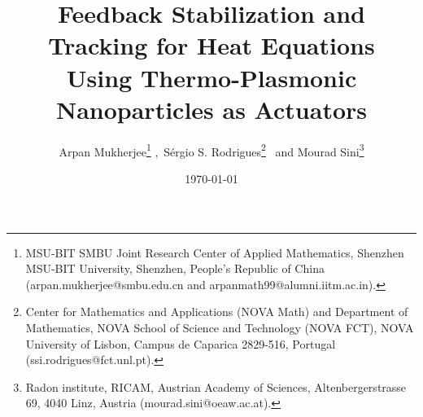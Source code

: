 \documentclass[11pt,a4paper]{article}
\numberwithin{equation}{section}
\theoremstyle{definition}
\newcommand{\1}{\mathbbm{1}}
\begin{document}
\title{%
\Large \textbf{Feedback Stabilization and Tracking for Heat Equations}\\ \textbf{Using Thermo-Plasmonic Nanoparticles as Actuators}
}

\author{Arpan Mukherjee\footnote{MSU-BIT SMBU Joint Research Center of Applied Mathematics, Shenzhen MSU-BIT University, Shenzhen, People's Republic of China (arpan.mukherjee@smbu.edu.cn and arpanmath99@alumni.iitm.ac.in).} ,\ Sérgio S. Rodrigues\thanks{  Center for Mathematics and Applications (NOVA Math) and Department of Mathematics, NOVA School of Science and Technology (NOVA FCT), NOVA University of Lisbon, Campus de Caparica
2829-516,  Portugal (ssi.rodrigues@fct.unl.pt).}
\ and
Mourad Sini\thanks{Radon institute, RICAM, Austrian Academy of Sciences, Altenbergerstrasse 69, 4040 Linz, Austria (mourad.sini@oeaw.ac.at).}}

\date{\today}

\maketitle
\end{document}
